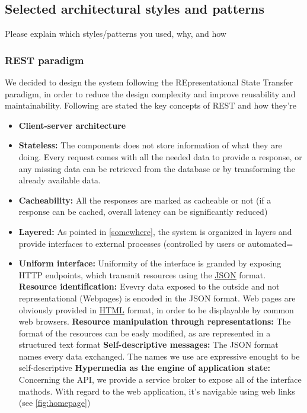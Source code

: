 \documentclass{article}
\newcommand{\link}[2]{{\color{blue}\underline{\href{#1}{#2}}}}
\begin{document}
	\subsection{Selected architectural styles and patterns} Please	explain	which	styles/patterns	you	used,	
why,	and	how
		\subsubsection{REST paradigm}
			We decided to design the system following the REpresentational State Transfer paradigm, 				in order to reduce the design complexity and improve reusability and maintainability.
			Following are stated the key concepts of REST and how they're 
			\begin{itemize}
				\item \textbf{Client-server architecture}
				\item \textbf{Stateless:} 
					The components does not store information of what they are doing. Every request comes with all the needed data to
					provide a response, or any missing data can be retrieved from the database or by transforming the already available
					data.
				\item \textbf{Cacheability:} 
					All the responses are marked as cacheable or not (if a response can be cached, overall 
					latency can be significantly reduced)
				\item \textbf{Layered:} 
					As pointed in \ref{somewhere}, the system is organized in layers and provide
					interfaces to external processes (controlled by users or automated=
				\item \textbf{Uniform interface:} 
					Uniformity of the interface is granded by exposing HTTP endpoints, which transmit resources using
					the \link{https://json.org/json-en.html}{JSON} format.
					\subitem \textbf{Resource identification:} 
						Evevry data exposed to the outside and not representational (Webpages) is 
						encoded in the JSON format. Web pages are obviously provided in 
						\link{https://en.wikipedia.org/wiki/HTML}{HTML} format, in order to be displayable by
						common web browsers.
					\subitem \textbf{Resource manipulation through representations:}
						The format of the resources can be easly modified, as are represented
						in a structured text format
					\subitem \textbf{Self-descriptive messages:}
						The JSON format names every data exchanged. The names we use are
						expressive enought to be self-descriptive
					\subitem \textbf{Hypermedia as the engine of application state:}
						Concerning the API, we provide a service broker to expose all of the
						interface mathods. With regard to the web application, it's navigable 
						using web links (see \ref{fig:homepage})
			\end{itemize}
\end{document}
